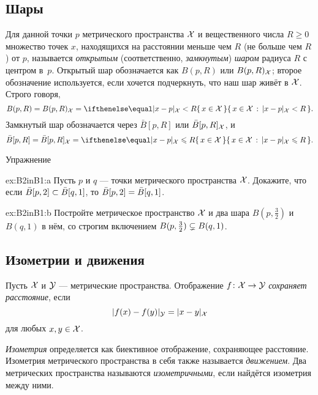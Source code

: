 \subsection*{Шары}

Для данной точки $p$ метрического пространства $\mathcal{X}$ и вещественного числа $R\ge 0$ множество точек $x$, находящихся на расстоянии меньше чем $R$ (не больше чем $R$) от $p$, называется \emph{открытым} (соответственно, \emph{замкнутым}) \emph{шаром} радиуса $R$ с центром в~$p$.
Открытый шар обозначается как $B(p,R)$ или $B(p,R)_{\mathcal{X}}$;
второе обозначение используется, если хочется подчеркнуть, что наш шар живёт в $\mathcal{X}$.
Строго говоря,
\[B(p,R)=B(p,R)_{\spc{X}}=\set{x\in \spc{X}}{\dist{x}{p}{\spc{X}}< R}.\]
Замкнутый шар обозначается через $\bar B[p,R]$ или $\bar B[p,R]_{\mathcal{X}}$, и
\[\bar B[p,R]=\bar B[p,R]_{\spc{X}}=\set{x\in \spc{X}}{\dist{x}{p}{\spc{X}}\le R}.\]

\begin{thm}{Упражнение}\label{ex:B2inB1}

\begin{subthm}{ex:B2inB1:a}
Пусть $p$ и $q$ --- точки метрического пространства $\mathcal{X}$.
Докажите, что если $\bar B[p,2]\z\subset \bar B[q,1]$, то $\bar B[p,2]\z=\bar B[q,1]$.
\end{subthm}

\begin{subthm}{ex:B2inB1:b}
Постройте метрическое пространство $\mathcal{X}$ и два шара $B(p,\tfrac32)$ и $B(q,1)$ в нём, со строгим включением
$B(p,\tfrac32)\z\subsetneq B(q,1)$.
\end{subthm}

\end{thm}

\subsection*{Изометрии и движения}

Пусть $\mathcal{X}$ и $\mathcal{Y}$ --- метрические пространства.
Отображение $f\:\spc{X} \z\to \spc{Y}$ \emph{сохраняет расстояние}, если 
$$\dist{f(x)}{f(y)}{\spc{Y}}
 = \dist{x}{y}{\spc{X}}$$
для любых $x,y\in {\mathcal{X}}$.

\emph{Изометрия} определяется как биективное отображение, сохраняющее расстояние.
Изометрия метрического пространства в себя также называется \emph{движением}.
Два метрических пространства называются \emph{изометричными}, если найдётся изометрия между ними.

